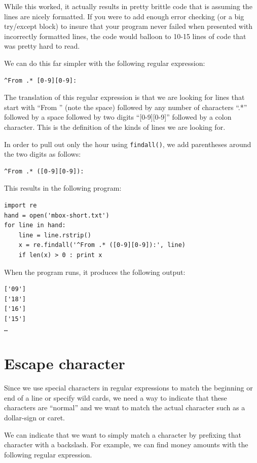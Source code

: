 \documentclass[11pt]{book}
\begin{document}
While this worked, it actually results in pretty brittle code that is assuming the lines are nicely formatted.  If you were to add enough error checking (or a big try/except block) to insure that your program never failed when presented with incorrectly formatted lines, the code would balloon to 10-15 lines of code that was pretty hard to read.

We can do this far simpler with the following regular expression:

\beforeverb
\begin{verbatim}
^From .* [0-9][0-9]:
\end{verbatim}
\afterverb
%
The translation of this regular expression is that we are looking for lines that start with ``From '' (note the space) followed by any number of characters ``.*'' followed by a space followed by two digits ``[0-9][0-9]'' followed by a colon character.  This is the definition of the kinds of lines we are looking for.  

In order to pull out only the hour using {\tt findall()}, we add parentheses around the two digits as follows:

\beforeverb
\begin{verbatim}
^From .* ([0-9][0-9]):
\end{verbatim}
\afterverb
%
This results in the following program:

\beforeverb
\begin{verbatim}
import re
hand = open('mbox-short.txt')
for line in hand:
    line = line.rstrip()
    x = re.findall('^From .* ([0-9][0-9]):', line)
    if len(x) > 0 : print x
\end{verbatim}
\afterverb
%
When the program runs, it produces the following output:

\beforeverb
\begin{verbatim}
['09']
['18']
['16']
['15']
…
\end{verbatim}
\afterverb
%
\section{Escape character}

Since we use special characters in regular expressions to match the beginning or end of 
a line or specify wild cards, we need a way to indicate that these characters are ``normal'' 
and we want to match the actual character such as a dollar-sign or caret.

We can indicate that we want to simply match a character by prefixing that character 
with a backslash.  For example, we can find money amounts with the following regular
expression.
\end{document}
